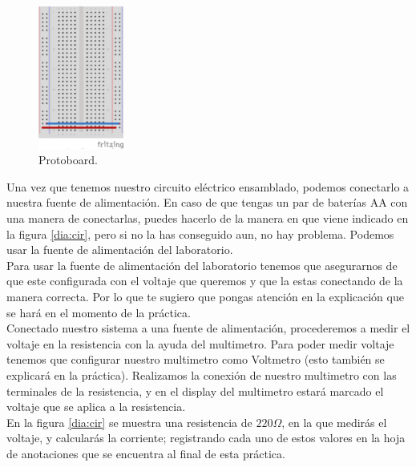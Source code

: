     \begin{figure}[h]
    	\begin{center}
    		\includegraphics[width=0.25\textwidth]{images/protoboard.png}
    		\caption{Protoboard.}
    		\label{dia:proto}
    	\end{center}
    \end{figure}

    Una vez que tenemos nuestro circuito eléctrico ensamblado, podemos conectarlo a nuestra fuente de alimentación. En caso de que tengas un par de baterías AA con una manera de conectarlas, puedes hacerlo de la manera en que viene indicado en la figura \ref{dia:cir}, pero si no la has conseguido aun, no hay problema. Podemos usar la fuente de alimentación del laboratorio. \\

    Para usar la fuente de alimentación del laboratorio tenemos que asegurarnos de que este configurada con el voltaje que queremos y que la estas conectando de la manera correcta. Por lo que te sugiero que pongas atención en la explicación que se hará en el momento de la práctica. \\

    Conectado nuestro sistema a una fuente de alimentación, procederemos a medir el voltaje en la resistencia con la ayuda del multimetro. Para poder medir voltaje tenemos que configurar nuestro multimetro como Voltmetro (esto también se explicará en la práctica). Realizamos la conexión de nuestro multimetro con las terminales de la resistencia, y en el display del multimetro estará marcado el voltaje que se aplica a la resistencia. \\

    En la figura \ref{dia:cir} se muestra una resistencia de $220 \Omega$, en la que medirás el voltaje, y calcularás la corriente; registrando cada uno de estos valores en la hoja de anotaciones que se encuentra al final de esta práctica. \\


